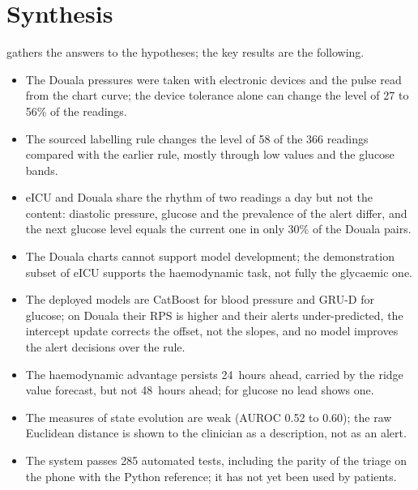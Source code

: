 \documentclass[11pt,a4paper,oneside]{report}
\begin{document}
\section{Synthesis}\label{sec:results-synthesis}

 gathers the answers to the hypotheses; the key results are the following.
\begin{itemize}
  \item The Douala pressures were taken with electronic devices and the pulse read from the chart curve; the device tolerance alone can change the level of 27 to 56\% of the readings.
  \item The sourced labelling rule changes the level of 58 of the 366 readings compared with the earlier rule, mostly through low values and the glucose bands.
  \item eICU and Douala share the rhythm of two readings a day but not the content: diastolic pressure, glucose and the prevalence of the alert differ, and the next glucose level equals the current one in only 30\% of the Douala pairs.
  \item The Douala charts cannot support model development; the demonstration subset of eICU supports the haemodynamic task, not fully the glycaemic one.
  \item The deployed models are CatBoost for blood pressure and GRU-D for glucose; on Douala their RPS is higher and their alerts under-predicted, the intercept update corrects the offset, not the slopes, and no model improves the alert decisions over the rule.
  \item The haemodynamic advantage persists 24~hours ahead, carried by the ridge value forecast, but not 48~hours ahead; for glucose no lead shows one.
  \item The measures of state evolution are weak (AUROC 0.52 to 0.60); the raw Euclidean distance is shown to the clinician as a description, not as an alert.
  \item The system passes 285 automated tests, including the parity of the triage on the phone with the Python reference; it has not yet been used by patients.
\end{itemize}
\end{document}
